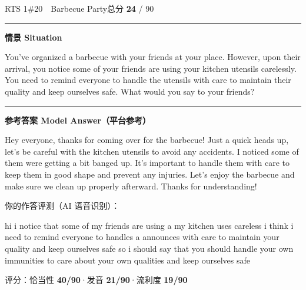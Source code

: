\documentclass[11pt]{article}
\newcommand{\spart}[1]{\textcolor{cPartial}{\bfseries #1}} %
\newcommand{\szero}[1]{\textcolor{cWrong}{\bfseries #1}}   %
\newcommand{\ptesub}[1]{%
  \par\needspace{2\baselineskip}\smallskip
  {\color{cAccent}\rule[-0.2ex]{3pt}{1.05em}}\hspace{6pt}%
  {\bfseries\color{cHead}#1}\par\nopagebreak\smallskip}
\newcommand{\sg}[1]{\textcolor{cSpkGood}{#1}}   %
\newcommand{\sy}[1]{\textcolor{cSpkOk}{#1}}     %
\newcommand{\sr}[1]{\textcolor{cSpkBad}{#1}}    %
\begin{document}
\begin{qblock}{RTS 1\quad \#20\ \ Barbecue Party}{总分 \textcolor{cAccent}{\bfseries 24} / 90}
\ptesub{情景 Situation}
\begin{promptbox}
You've organized a barbecue with your friends at your place. However, upon their arrival, you notice some of your friends are using your kitchen utensils carelessly. You need to remind everyone to handle the utensils with care to maintain their quality and keep ourselves safe. What would you say to your friends?
\end{promptbox}
\ptesub{参考答案 Model Answer（平台参考）}
\begin{modelbox}
Hey everyone, thanks for coming over for the barbecue! Just a quick heads up, let's be careful with the kitchen utensils to avoid any accidents. I noticed some of them were getting a bit banged up. It's important to handle them with care to keep them in good shape and prevent any injuries. Let's enjoy the barbecue and make sure we clean up properly afterward. Thanks for understanding!
\end{modelbox}
\smallskip\par{\footnotesize\color{gray}你的作答评测（AI 语音识别）：}
\begin{asrbox}
\sg{hi} \sr{i} \sg{notice that} \sr{some} \sg{of my friends are using} \sy{a} \sg{my kitchen} \sy{uses} \sy{careless i think i need to remind everyone to handles a} \sr{announces} \sg{with care} \sg{to maintain} \sy{your quality and} \sy{keep ourselves safe so i should say that you should handle your own} \sy{immunities to care about your own qualities and keep ourselves} \sy{safe}
\end{asrbox}
{\small 评分：恰当性 \spart{40/90}\quad·\quad 发音 \szero{21/90}\quad·\quad 流利度 \szero{19/90}}
\end{qblock}
\end{document}
